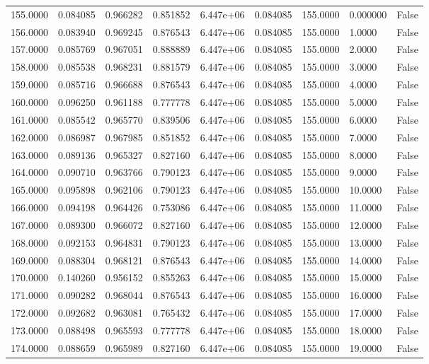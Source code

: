 \documentclass[11pt]{report}
\begin{document}
\begin{longtable}{lllllllll}
155.0000 & 0.084085 & 0.966282 & 0.851852 & 6.447e+06 & 0.084085 & 155.0000 & 0.000000 & False \\
156.0000 & 0.083940 & 0.969245 & 0.876543 & 6.447e+06 & 0.084085 & 155.0000 & 1.0000 & False \\
157.0000 & 0.085769 & 0.967051 & 0.888889 & 6.447e+06 & 0.084085 & 155.0000 & 2.0000 & False \\
158.0000 & 0.085538 & 0.968231 & 0.881579 & 6.447e+06 & 0.084085 & 155.0000 & 3.0000 & False \\
159.0000 & 0.085716 & 0.966688 & 0.876543 & 6.447e+06 & 0.084085 & 155.0000 & 4.0000 & False \\
160.0000 & 0.096250 & 0.961188 & 0.777778 & 6.447e+06 & 0.084085 & 155.0000 & 5.0000 & False \\
161.0000 & 0.085542 & 0.965770 & 0.839506 & 6.447e+06 & 0.084085 & 155.0000 & 6.0000 & False \\
162.0000 & 0.086987 & 0.967985 & 0.851852 & 6.447e+06 & 0.084085 & 155.0000 & 7.0000 & False \\
163.0000 & 0.089136 & 0.965327 & 0.827160 & 6.447e+06 & 0.084085 & 155.0000 & 8.0000 & False \\
164.0000 & 0.090710 & 0.963766 & 0.790123 & 6.447e+06 & 0.084085 & 155.0000 & 9.0000 & False \\
165.0000 & 0.095898 & 0.962106 & 0.790123 & 6.447e+06 & 0.084085 & 155.0000 & 10.0000 & False \\
166.0000 & 0.094198 & 0.964426 & 0.753086 & 6.447e+06 & 0.084085 & 155.0000 & 11.0000 & False \\
167.0000 & 0.089300 & 0.966072 & 0.827160 & 6.447e+06 & 0.084085 & 155.0000 & 12.0000 & False \\
168.0000 & 0.092153 & 0.964831 & 0.790123 & 6.447e+06 & 0.084085 & 155.0000 & 13.0000 & False \\
169.0000 & 0.088304 & 0.968121 & 0.876543 & 6.447e+06 & 0.084085 & 155.0000 & 14.0000 & False \\
170.0000 & 0.140260 & 0.956152 & 0.855263 & 6.447e+06 & 0.084085 & 155.0000 & 15.0000 & False \\
171.0000 & 0.090282 & 0.968044 & 0.876543 & 6.447e+06 & 0.084085 & 155.0000 & 16.0000 & False \\
172.0000 & 0.092682 & 0.963081 & 0.765432 & 6.447e+06 & 0.084085 & 155.0000 & 17.0000 & False \\
173.0000 & 0.088498 & 0.965593 & 0.777778 & 6.447e+06 & 0.084085 & 155.0000 & 18.0000 & False \\
174.0000 & 0.088659 & 0.965989 & 0.827160 & 6.447e+06 & 0.084085 & 155.0000 & 19.0000 & False \\

\end{longtable}
\end{document}
